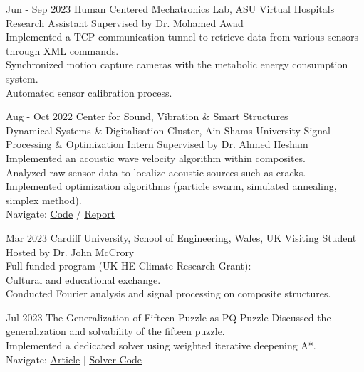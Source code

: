 \documentclass[hidelinks]{report}
\begin{document}
\entry
    {Jun - Sep 2023}
    {Human Centered Mechatronics Lab, \normalfont ASU Virtual Hospitals }
    {Research Assistant}
    {
      Supervised by Dr. Mohamed Awad \\
      \textbullet Implemented a TCP communication tunnel to retrieve data from various sensors through XML commands. \\
      \textbullet Synchronized motion capture cameras with the metabolic energy consumption system. \\
      \textbullet Automated sensor calibration process.
    }

\entry
    {Aug - Oct 2022}
    {Center for Sound, Vibration \& Smart Structures \\
      \normalfont Dynamical Systems \& Digitalisation Cluster, Ain Shams University \vspace{1mm}
    }
    {Signal Processing \& Optimization Intern}
    {
      Supervised by Dr. Ahmed Hesham\\
      \textbullet Implemented an acoustic wave velocity algorithm within composites.\\
      \textbullet Analyzed raw sensor data to localize acoustic sources such as cracks. \\
      \textbullet Implemented optimization algorithms (particle swarm, simulated annealing, simplex method).\\
      \textbullet Navigate: 
      \href{\github/AE-software.git}{\underline{Code}} / %
      \href{\github/AE-software/blob/master/Final-Report/Report.pdf}{\underline{Report}}
    }

\vspace{2mm}


\entry
    {Mar 2023}
    {Cardiff University, School of Engineering, \normalfont Wales, UK}
    {Visiting Student}
    {
      Hosted by Dr. John McCrory \\
      Full funded program (UK-HE Climate Research Grant): \\
      \textbullet Cultural and educational exchange. \\
      \textbullet Conducted Fourier analysis and signal processing on composite structures. \\ 
    }

\vspace{2mm}
\newpage 
{}

\entry
    {Jul 2023}
    {The Generalization of Fifteen Puzzle as PQ Puzzle}  
    {} 
    {
      \textbullet Discussed the generalization and solvability of the fifteen puzzle.\\
      \textbullet Implemented a dedicated solver using weighted iterative deepening A*.\\
      \textbullet Navigate:  \href{\blog/fifteen-puzzle}{\underline{Article}} | 
      \href{\github/fifteen-puzzle-solver}{\underline{Solver Code}}
    } 
\end{document}
